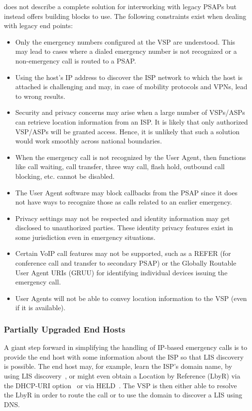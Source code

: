 \documentclass[12pt]{article}
\begin{document}
\cite{draft-ietf-ecrit-phonebcp} does not describe a complete solution for interworking with legacy PSAPs but instead offers building blocks to use. The following constraints exist when dealing with legacy end points: 
\begin{itemize}
\item Only the emergency numbers configured at the VSP are understood. This may lead to cases where a dialed emergency number is not recognized or a non-emergency call is routed to a PSAP. 
\item Using the host's IP address to discover the ISP network to which the host is attached is challenging and may, in case of mobility protocols and VPNs, lead to wrong results.
\item Security and privacy concerns may arise when a large number of VSPs/ASPs can retrieve location information from an ISP. It is likely that only authorized VSP/ASPs will be granted access. Hence, it is unlikely that such a solution would work smoothly across national boundaries.
\item When the emergency call is not recognized by the User Agent, then functions like call waiting, call transfer, three way call, flash hold, outbound call blocking, etc. cannot be disabled. 
\item The User Agent software may block callbacks from the PSAP since it does not have ways to recognize those as calls related to an earlier emergency. 
\item Privacy settings may not be respected and identity information may get disclosed to unauthorized parties. These identity privacy features exist in some jurisdiction even in emergency situations.
\item Certain VoIP call features may not be supported, such as a REFER (for conference call and transfer to secondary PSAP) or the Globally Routable User Agent URIs (GRUU) for identifying individual devices issuing the emergency call. 
\item User Agents will not be able to convey location information to the VSP (even if it is available). 
\end{itemize}

\subsubsection{Partially Upgraded End Hosts\\}

A giant step forward in simplifying the handling of IP-based emergency calls is to provide the end host with some information about the ISP so that LIS discovery is possible. The end host may, for example, learn the ISP's domain name, by using LIS discovery~\cite{rfc5986}, or might even obtain a Location by Reference (LbyR) via the DHCP-URI option~\cite{draft-ietf-geopriv-dhcp-lbyr-uri-option} or via HELD~\cite{rfc5985}. The VSP is then either able to resolve the LbyR in order to route the call or to use the domain to discover a LIS using DNS.
\end{document}
